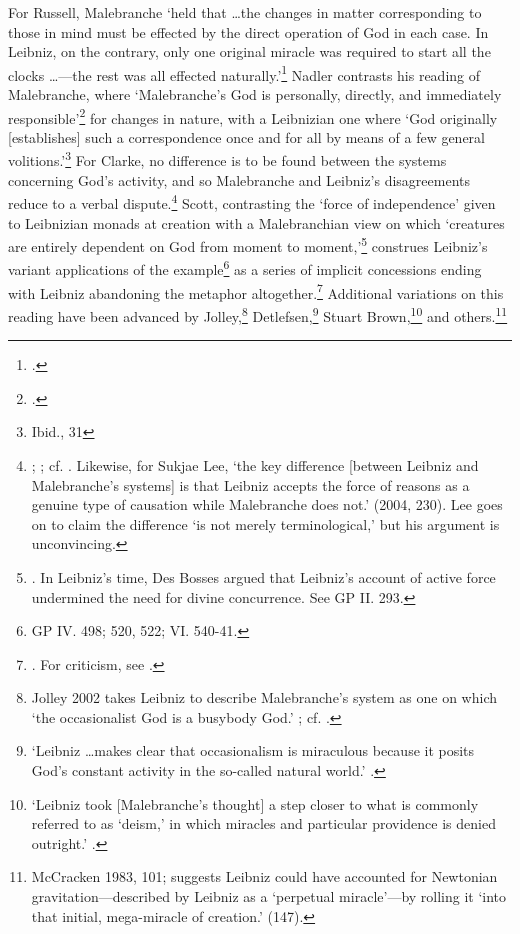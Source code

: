 \documentclass{article}
\begin{document}
For Russell, Malebranche `held that \ldots the changes in matter
corresponding to those in mind must be effected by the direct operation
of God in each case. In Leibniz, on the contrary, only one original
miracle was required to start all the clocks \ldots---the rest
was all effected naturally.'\footnote{\autocite[137]{Russell1951}.} Nadler
contrasts his reading of Malebranche, where `Malebranche's God is
personally, directly, and immediately responsible'\footnote{\autocite[32]{Nadler1993}.} for changes in nature, with a Leibnizian one where `God
originally {[}establishes{]} such a correspondence once and for all by
means of a few general volitions.'\footnote{Ibid., 31} For Clarke, no
difference is to be found between the systems concerning God's activity,
and so Malebranche and Leibniz's disagreements reduce to a verbal
dispute.\footnote{\autocite[121]{Clarke1989}; \autocite[passim]{Clarke1995}; cf. \autocite[39]{Black1997}. Likewise, for Sukjae Lee, `the key difference {[}between Leibniz
  and Malebranche's systems{]} is that Leibniz accepts the force of
  reasons as a genuine type of causation while Malebranche does not.'
  (2004, 230). Lee goes on to claim the difference `is not merely
  terminological,' but his argument is unconvincing.} Scott, contrasting
the `force of independence' given to Leibnizian monads at creation with
a Malebranchian view on which `creatures are entirely dependent on God
from moment to moment,'\footnote{\autocite[452]{Scott1997}. In Leibniz's time, Des
  Bosses argued that Leibniz's account of active force undermined the
  need for divine concurrence. See GP II. 293.} construes Leibniz's
variant applications of the example\footnote{GP IV. 498; 520, 522; VI.
  540-41.} as a series of implicit concessions ending with Leibniz
abandoning the metaphor altogether.\footnote{\autocite[462]{Scott1997}. For
  criticism, see \autocite[321-322]{Bobro2008}.} Additional variations on this
reading have been advanced by Jolley,\footnote{Jolley 2002 takes Leibniz
  to describe Malebranche's system as one on which `the occasionalist
  God is a busybody God.' \autocite[246]{Jolley2002}; cf. \autocite[106-107]{Jolley1990}.}
Detlefsen,\footnote{`Leibniz \ldots makes clear that
  occasionalism is miraculous because it posits God's constant activity
  in the so-called natural world.' \autocite[443]{Detlefsen2003}.} Stuart
Brown,\footnote{`Leibniz took {[}Malebranche's thought{]} a step closer
  to what is commonly referred to as `deism,' in which miracles and
  particular providence is denied outright.' \autocite[273]{Brown2000}.} and
others.\footnote{McCracken 1983, 101; \autocite{Brown2007} suggests Leibniz could
  have accounted for Newtonian gravitation---described by Leibniz as a
  `perpetual miracle'---by rolling it `into that initial, mega-miracle
  of creation.' (147).}
\end{document}
